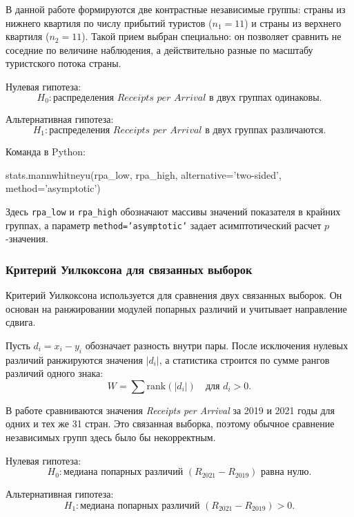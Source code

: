 \documentclass[14pt,a4paper]{extarticle}
\newcommand{\pycmd}[1]{%
  \begin{tcolorbox}[enhanced,breakable,colback=white,colframe=black,boxrule=0.5pt,left=5pt,right=5pt,top=5pt,bottom=5pt,arc=0pt]
  {\ttfamily\small #1}
  \end{tcolorbox}%
}
\begin{document}
В данной работе формируются две контрастные независимые группы: страны из нижнего квартиля по числу прибытий туристов ($n_1=11$) и страны из верхнего квартиля ($n_2=11$). Такой прием выбран специально: он позволяет сравнить не соседние по величине наблюдения, а действительно разные по масштабу туристского потока страны.

\par\indent Нулевая гипотеза:
\begin{equation*}
H_0: \text{распределения } \textit{Receipts per Arrival} \text{ в двух группах одинаковы.}
\end{equation*}
\par\indent Альтернативная гипотеза:
\begin{equation*}
H_1: \text{распределения } \textit{Receipts per Arrival} \text{ в двух группах различаются.}
\end{equation*}

Команда в Python:
\pycmd{stats.mannwhitneyu(rpa\_low, rpa\_high, alternative='two-sided', method='asymptotic')}
Здесь \texttt{rpa\_low} и \texttt{rpa\_high} обозначают массивы значений показателя в крайних группах, а параметр \texttt{method='asymptotic'} задает асимптотический расчет $p$-значения.

\subsubsection{Критерий Уилкоксона для связанных выборок}

Критерий Уилкоксона используется для сравнения двух связанных выборок. Он основан на ранжировании модулей попарных различий и учитывает направление сдвига.

Пусть $d_i = x_i - y_i$ обозначает разность внутри пары. После исключения нулевых различий ранжируются значения $|d_i|$, а статистика строится по сумме рангов различий одного знака:
\begin{equation}
W = \sum \text{rank}(|d_i|) \quad \text{для } d_i > 0.
\end{equation}

В работе сравниваются значения \textit{Receipts per Arrival} за 2019 и 2021 годы для одних и тех же 31 стран. Это связанная выборка, поэтому обычное сравнение независимых групп здесь было бы некорректным.

\par\indent Нулевая гипотеза:
\begin{equation*}
H_0: \text{медиана попарных различий } (R_{2021}-R_{2019}) \text{ равна нулю.}
\end{equation*}
\par\indent Альтернативная гипотеза:
\begin{equation*}
H_1: \text{медиана попарных различий } (R_{2021}-R_{2019}) > 0.
\end{equation*}
\end{document}
